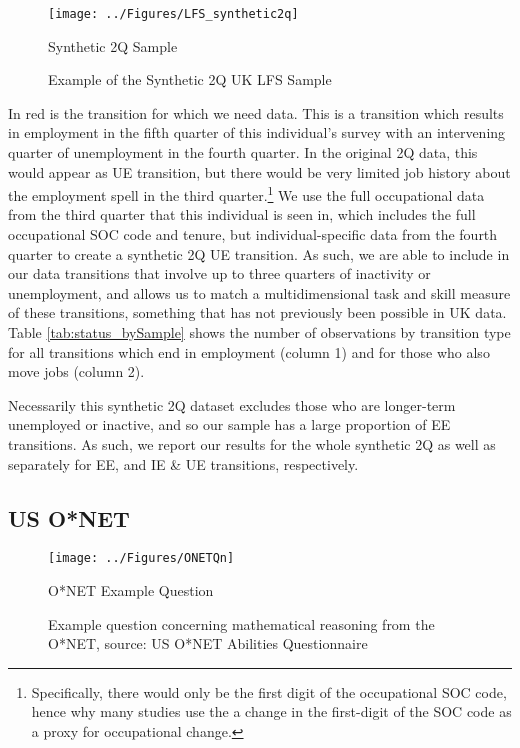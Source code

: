 \documentclass[12pt,authoryear]{elsarticle}
\begin{document}
\begin{figure}[t!]
	\centering
	\texttt{[image: ../Figures/LFS\_synthetic2q]}
	\caption{Synthetic 2Q Sample}
	\caption*{\footnotesize{Example of the Synthetic 2Q UK LFS Sample}}
	\label{fig:LFS_synthetic2q}
\end{figure}
In red is the transition for which we need data. This is a transition  which results in employment in the fifth quarter of this individual's survey with an intervening quarter of unemployment in the fourth quarter. In the original 2Q data, this would appear as UE transition, but there would be very limited job history about the employment spell in the third quarter.\footnote{Specifically, there would only be the first digit of the occupational SOC code, hence why many studies use the a change in the first-digit of the SOC code as a proxy for occupational change.} We use the full occupational data from the third quarter that this individual is seen in,  which includes the full occupational SOC code and tenure, but individual-specific data from the fourth quarter to create a synthetic 2Q UE transition. As such, we are able to include in our data transitions that involve up to three quarters of inactivity or unemployment, and allows us to match a multidimensional task and skill measure of these transitions, something that has not previously been possible in UK data. Table \ref{tab:status_bySample} shows the number of observations by transition type for all transitions which end in employment (column 1) and for those who also move jobs (column 2).
 
Necessarily this synthetic 2Q dataset excludes those who are longer-term unemployed or inactive, and so our sample has a large proportion of EE transitions. As such, we report our results for the whole synthetic 2Q as well as separately for EE, and IE \& UE transitions, respectively. 

	
	
	\subsection{US O*NET}
	\label{sec:ONET}
	
	\begin{figure}[t!]
		\centering
		\texttt{[image: ../Figures/ONETQn]}
		\caption{O*NET Example Question}
		\caption*{\footnotesize{Example question concerning mathematical reasoning from the O*NET, source: US O*NET Abilities Questionnaire}}
		\label{fig:ONETQn}
	\end{figure}
	
\end{document}
